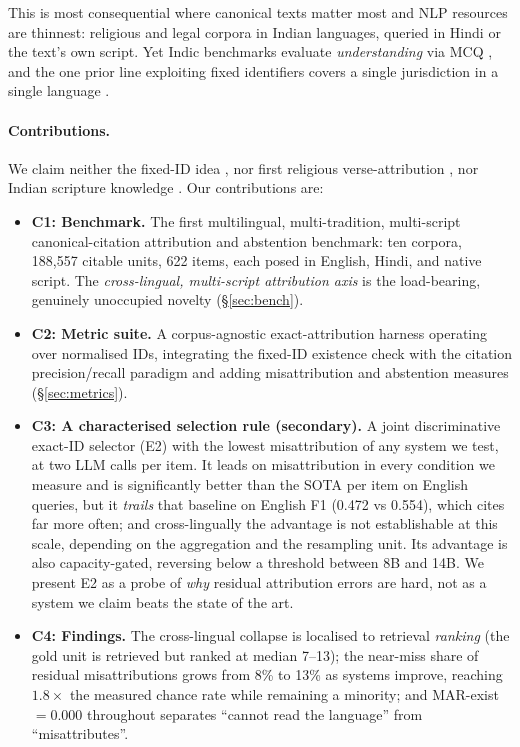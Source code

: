 \documentclass[11pt]{article}
\begin{document}
This is most consequential where canonical texts matter most and NLP resources
are thinnest: religious and legal corpora in Indian languages, queried in Hindi
or the text's own script. Yet Indic benchmarks evaluate \emph{understanding} via
MCQ \cite{verma2024milu,parambench2025,indicqa2024}, and the one prior line
exploiting fixed identifiers covers a single jurisdiction in a single language
\cite{ovcharov2026citation}.

\paragraph{Contributions.} We claim neither the fixed-ID idea
\cite{ovcharov2026citation}, nor first religious verse-attribution
\cite{islamiceval2025}, nor Indian scripture knowledge
\cite{parambench2025,verma2024milu}. Our contributions are:

\begin{itemize}[noitemsep,topsep=2pt]
\item \textbf{C1: Benchmark.} The first multilingual, multi-tradition,
multi-script canonical-citation attribution and abstention benchmark: ten
corpora, 188{,}557 citable units, 622 items, each posed in English, Hindi, and
native script. The \emph{cross-lingual, multi-script attribution axis} is the
load-bearing, genuinely unoccupied novelty (\S\ref{sec:bench}).
\item \textbf{C2: Metric suite.} A corpus-agnostic exact-attribution harness
operating over normalised IDs, integrating the fixed-ID existence check
\cite{ovcharov2026citation} with the citation precision/recall paradigm
\cite{gao2023alce} and adding misattribution and abstention measures
(\S\ref{sec:metrics}).
\item \textbf{C3: A characterised selection rule (secondary).} A joint
discriminative exact-ID selector (E2) with the lowest misattribution of any
system we test, at two LLM calls per item. It leads on
misattribution in every condition we measure and is significantly better than the
SOTA per item on English queries, but it \emph{trails} that baseline on English
F1 (0.472 vs 0.554), which cites far more often; and cross-lingually the
advantage is not establishable at this scale, depending on the aggregation and
the resampling unit. Its advantage is also capacity-gated, reversing below a
threshold between 8B and 14B. We present E2 as a probe of \emph{why} residual
attribution errors are hard, not as a system we claim beats the state of the
art.
\item \textbf{C4: Findings.} The cross-lingual collapse is localised to
retrieval \emph{ranking} (the gold unit is retrieved but ranked at median 7--13);
the near-miss share of residual misattributions grows from 8\% to 13\% as systems
improve, reaching $1.8\times$ the measured chance rate while remaining a
minority; and MAR-exist $=0.000$
throughout separates ``cannot read the language'' from ``misattributes''.
\end{itemize}
\end{document}
